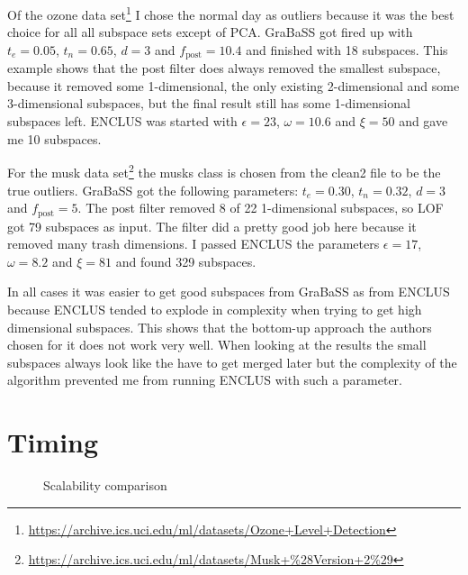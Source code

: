 Of the ozone data set\footnote{\url{https://archive.ics.uci.edu/ml/datasets/Ozone+Level+Detection}} I chose the normal day as outliers because it was the best choice for all all subspace sets except of PCA. GraBaSS got fired up with $t_e = 0.05$, $t_n = 0.65$, $d = 3$ and $f_\mathrm{post} = 10.4$ and finished with \num{18} subspaces. This example shows that the post filter does always removed the smallest subspace, because it removed some 1-dimensional, the only existing 2-dimensional and some 3-dimensional subspaces, but the final result still has some 1-dimensional subspaces left. ENCLUS was started with $\epsilon = 23$, $\omega = 10.6$ and $\xi = 50$ and gave me \num{10} subspaces.

For the musk data set\footnote{\url{https://archive.ics.uci.edu/ml/datasets/Musk+\%28Version+2\%29}} the musks class is chosen from the clean2 file to be the true outliers. GraBaSS got the following parameters: $t_e = 0.30$, $t_n = 0.32$, $d = 3$ and $f_\mathrm{post} = 5$. The post filter removed \num{8} of \num{22} 1-dimensional subspaces, so LOF got \num{79} subspaces as input. The filter did a pretty good job here because it removed many trash dimensions. I passed ENCLUS the parameters $\epsilon = 17$, $\omega = 8.2$ and $\xi = 81$ and found \num{329} subspaces.

In all cases it was easier to get good subspaces from GraBaSS as from ENCLUS because ENCLUS tended to explode in complexity when trying to get high dimensional subspaces. This shows that the bottom-up approach the authors chosen for it does not work very well. When looking at the results the small subspaces always look like the have to get merged later but the complexity of the algorithm prevented me from running ENCLUS with such a parameter.

\section{Timing}\label{sec:time}

\begin{figure}
	\caption{Scalability comparison}
	\label{fig:scale}
	\centering
	
\end{figure}

